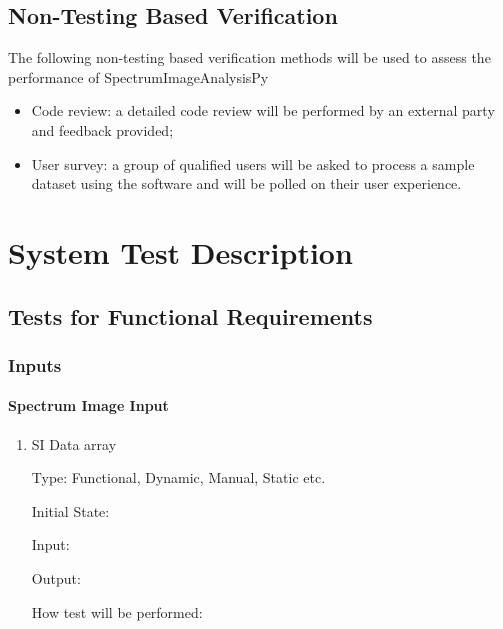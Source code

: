 \documentclass[12pt, titlepage]{article}
\newcommand{\progname}{SpectrumImageAnalysisPy}
\begin{document}
		

\subsection{Non-Testing Based Verification}

The following non-testing based verification methods will be used to assess the performance of \progname{}

\begin{itemize}
	\item Code review: a detailed code review will be performed by an external party and feedback provided;
	\item User survey: a group of qualified users will be asked to process a sample dataset using the software and will be polled on their user experience.
\end{itemize}


\section{System Test Description}
	
\subsection{Tests for Functional Requirements}

\subsubsection{Inputs}
		
\paragraph{Spectrum Image Input}

\begin{enumerate}

\item{SI Data array\\}

Type: Functional, Dynamic, Manual, Static etc.
					
Initial State: 
					
Input: 
					
Output: 
					
How test will be performed: 


\end{enumerate}
\end{document}
